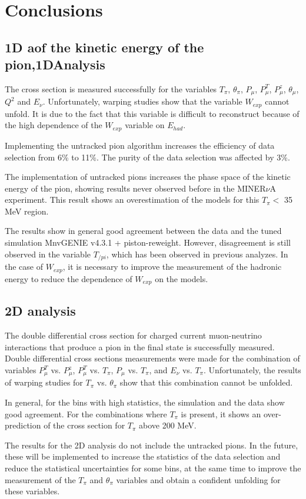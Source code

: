 \chapter{Conclusions}
\minitoc
\label{Cap:Conclusion}

\section{1D aof the kinetic energy of the pion,1DAnalysis}
The cross section is measured successfully for the variables $T_\pi$, $\theta_\pi$, $P_\mu$, $P^T_\mu$, $P^z_\mu$, $\theta_\mu$, $Q^2$ and $E_\nu$. Unfortunately, warping studies show that the variable $W_{exp}$ cannot unfold. It is due to the fact that this variable is difficult to reconstruct because of the high dependence of the $W_{exp}$ variable on $E_{had}$. 

Implementing the untracked pion algorithm increases the efficiency of data selection from 6\% to 11\%. The purity of the data selection was affected by 3\%.

The implementation of untracked pions increases the phase space of the kinetic energy of the pion, showing results never observed before in the MINER$\nu$A experiment. This result shows an overestimation of the models for this $T_\pi < $ 35 MeV region. 

The results show in general good agreement between the data and the tuned simulation MnvGENIE v4.3.1 + piston-reweight. However, disagreement is still observed in the variable $T_{/pi}$, which has been observed in previous analyzes. In the case of $W_{exp}$, it is necessary to improve the measurement of the hadronic energy to reduce the dependence of $W_{exp}$ on the models. 


\section{2D analysis}
\label{Conclusions:2DAnalysis}

The double differential cross section for charged current muon-neutrino interactions that produce a pion in the final state is successfully measured. Double differential cross sections measurements were made for the combination of variables $P^T_\mu$ vs. $P^z_\mu$, $P^T_\mu$ vs. $T_\pi$, $P_\mu$ vs. $T_\pi$, and $E_\nu$ vs. $T_\pi$. Unfortunately, the results of warping studies for $T_\pi$ vs. $\theta_\pi$ show that this combination cannot be unfolded. 

In general, for the bins with high statistics, the simulation and the data show good agreement. For the combinations where $T_\pi$ is present, it shows an over-prediction of the cross section for $T_\pi$ above 200 MeV. 

The results for the 2D analysis do not include the untracked pions. In the future, these will be implemented to increase the statistics of the data selection and reduce the statistical uncertainties for some bins, at the same time to improve the measurement of the $T_\pi$ and $\theta_\pi$ variables and obtain a confident unfolding for these variables. 

